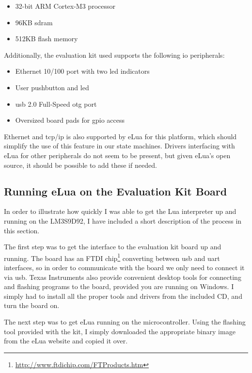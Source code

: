 \begin{itemize}
	\item 32-bit ARM Cortex-M3 processor
	\item 96KB \gls{sdram}
	\item 512KB flash memory
\end{itemize}

\noindent
Additionally, the evaluation kit used supports the following \gls{io} peripherals:

\begin{itemize}
	\item Ethernet 10/100 port with two \gls{led} indicators
	\item User pushbutton and \gls{led}
	\item \gls{usb} 2.0 Full-Speed \gls{otg} port
	\item Oversized board pads for \gls{gpio} access
\end{itemize}

\noindent
Ethernet and \gls{tcp}/\gls{ip} is also supported by eLua for this platform, which should simplify the use of this feature in our state machines. Drivers interfacing with eLua for other peripherals do not seem to be present, but given eLua's open source, it should be possible to add these if needed.

\subsection{Running eLua on the Evaluation Kit Board}
\label{sec:running_elua}
In order to illustrate how quickly I was able to get the Lua interpreter up and running on the LM3S9D92, I have included a short description of the process in this section.

\noindent
The first step was to get the interface to the evaluation kit board up and running. The board has an FTDI chip\footnote{\url{http://www.ftdichip.com/FTProducts.htm}} converting between \gls{usb} and \gls{uart} interfaces, so in order to communicate with the board we only need to connect it via \gls{usb}. Texas Instruments also provide convenient desktop tools for connecting and flashing programs to the board, provided you are running on Windows. I simply had to install all the proper tools and drivers from the included CD, and turn the board on.

\noindent
The next step was to get eLua running on the microcontroller. Using the flashing tool provided with the kit, I simply downloaded the appropriate binary image from the eLua website and copied it over.

